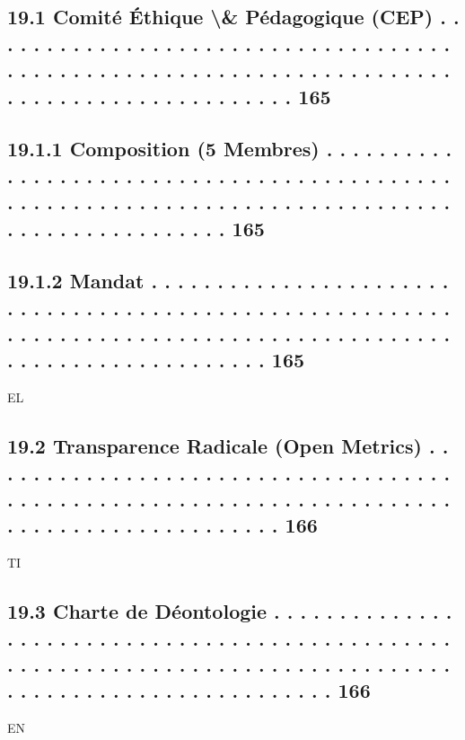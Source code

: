 \documentclass[12pt,landscape,a4paper]{article}
\begin{document}
\subsection{19.1    Comité Éthique \textbackslash{}& Pédagogique (CEP) . . . . . . . . . . . . . . . . . . . . . . . . . . . . . . . . . . . . . . . . . . . . . . . . . . . . . . . . . . . . . . . . . . . . . . . . . . . . . . . . . . . . . . . . . . . . 165}
\subsection{19.1.1             Composition (5 Membres) . . . . . . . . . . . . . . . . . . . . . . . . . . . . . . . . . . . . . . . . . . . . . . . . . . . . . . . . . . . . . . . . . . . . . . . . . . . . . . . . . . . . . . . . . . . . . . . 165}
\subsection{19.1.2             Mandat . . . . . . . . . . . . . . . . . . . . . . . . . . . . . . . . . . . . . . . . . . . . . . . . . . . . . . . . . . . . . . . . . . . . . . . . . . . . . . . . . . . . . . . . . . . . . . . . . . . . . . . . . . . . . . . 165}
\vspace{0.5em}
\vspace{0.5em}
\vspace{0.5em}
\vspace{0.5em}
EL\\
\subsection{19.2    Transparence Radicale (Open Metrics) . . . . . . . . . . . . . . . . . . . . . . . . . . . . . . . . . . . . . . . . . . . . . . . . . . . . . . . . . . . . . . . . . . . . . . . . . . . . . . . . . . . . . . . . . . . 166}
\vspace{0.5em}
\vspace{0.5em}
\vspace{0.5em}
\vspace{0.5em}
TI\\
\subsection{19.3    Charte de Déontologie . . . . . . . . . . . . . . . . . . . . . . . . . . . . . . . . . . . . . . . . . . . . . . . . . . . . . . . . . . . . . . . . . . . . . . . . . . . . . . . . . . . . . . . . . . . . . . . . . . . . . . . . . . . 166}
\vspace{0.5em}
\vspace{0.5em}
\vspace{0.5em}
\vspace{0.5em}
EN\\
\end{document}
